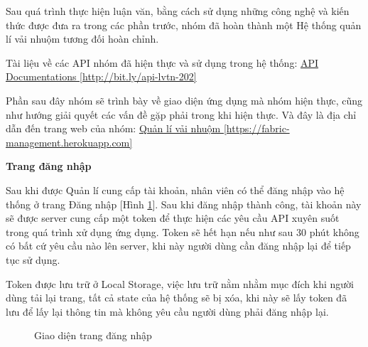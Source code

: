 Sau quá trình thực hiện luận văn, bằng cách sử dụng những công nghệ và kiến thức được đưa ra trong các phần trước, nhóm đã hoàn thành một Hệ thống quản lí vải nhuộm tương đối hoàn chỉnh.\par

Tài liệu về các API nhóm đã hiện thực và sử dụng trong hệ thống: \href{http://bit.ly/api-lvtn-202}{API Documentations [http://bit.ly/api-lvtn-202]}

Phần sau đây nhóm sẽ trình bày về giao diện ứng dụng mà nhóm hiện thực, cũng như hướng giải quyết các vấn đề gặp phải trong khi hiện thực. Và đây là địa chỉ dẫn đến trang web của nhóm: \href{https://fabric-management.herokuapp.com}{Quản lí vải nhuộm [https://fabric-management.herokuapp.com]}

\textbf{Trang đăng nhập}

Sau khi được Quản lí cung cấp tài khoản, nhân viên có thể đăng nhập vào hệ thống ở trang Đăng nhập [Hình \ref{result_dang_nhap}]. Sau khi đăng nhập thành công, tài khoản này sẽ được server cung cấp một token để thực hiện các yêu cầu API xuyên suốt trong quá trình xử dụng ứng dụng. Token sẽ hết hạn nếu như sau 30 phút không có bất cứ yêu cầu nào lên server, khi này người dùng cần đăng nhập lại để tiếp tục sử dụng.\par
Token được lưu trữ ở Local Storage, việc lưu trữ nằm nhằm mục đích khi người dùng tải lại trang, tất cả state của hệ thống sẽ bị xóa, khi này sẽ lấy token đã lưu để lấy lại thông tin mà không yêu cầu người dùng phải đăng nhập lại.
\begin{figure}[H]
    \begin{center}
        \caption{Giao diện trang đăng nhập}
        \label{result_dang_nhap}
    \end{center}
\end{figure}

